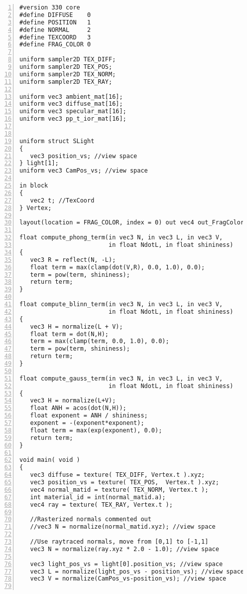 \begin{Verbatim}[frame=single, numbers=left, label=Final fragment shader]
#version 330 core
#define DIFFUSE    0
#define POSITION   1
#define NORMAL     2
#define TEXCOORD   3
#define FRAG_COLOR 0

uniform sampler2D TEX_DIFF;
uniform sampler2D TEX_POS;
uniform sampler2D TEX_NORM;
uniform sampler2D TEX_RAY;

uniform vec3 ambient_mat[16];
uniform vec3 diffuse_mat[16];
uniform vec3 specular_mat[16];
uniform vec3 pp_t_ior_mat[16];


uniform struct SLight
{
   vec3 position_vs; //view space
} light[1];
uniform vec3 CamPos_vs; //view space

in block
{
   vec2 t; //TexCoord
} Vertex;

layout(location = FRAG_COLOR, index = 0) out vec4 out_FragColor;

float compute_phong_term(in vec3 N, in vec3 L, in vec3 V, 
                         in float NdotL, in float shininess)
{
   vec3 R = reflect(N, -L);
   float term = max(clamp(dot(V,R), 0.0, 1.0), 0.0);
   term = pow(term, shininess);
   return term;
}

float compute_blinn_term(in vec3 N, in vec3 L, in vec3 V, 
                         in float NdotL, in float shininess)
{
   vec3 H = normalize(L + V);
   float term = dot(N,H);
   term = max(clamp(term, 0.0, 1.0), 0.0);
   term = pow(term, shininess);
   return term;
}

float compute_gauss_term(in vec3 N, in vec3 L, in vec3 V, 
                         in float NdotL, in float shininess)
{
   vec3 H = normalize(L+V);
   float ANH = acos(dot(N,H));
   float exponent = ANH / shininess;
   exponent = -(exponent*exponent);
   float term = max(exp(exponent), 0.0);
   return term;
}

void main( void )
{
   vec3 diffuse = texture( TEX_DIFF, Vertex.t ).xyz;
   vec3 position_vs = texture( TEX_POS,  Vertex.t ).xyz;
   vec4 normal_matid = texture( TEX_NORM, Vertex.t );
   int material_id = int(normal_matid.a);
   vec4 ray = texture( TEX_RAY, Vertex.t );
	
   //Rasterized normals commented out
   //vec3 N = normalize(normal_matid.xyz); //view space

   //Use raytraced normals, move from [0,1] to [-1,1]
   vec3 N = normalize(ray.xyz * 2.0 - 1.0); //view space

   vec3 light_pos_vs = light[0].position_vs; //view space
   vec3 L = normalize(light_pos_vs - position_vs); //view space
   vec3 V = normalize(CamPos_vs-position_vs); //view space
	

\end{Verbatim}
